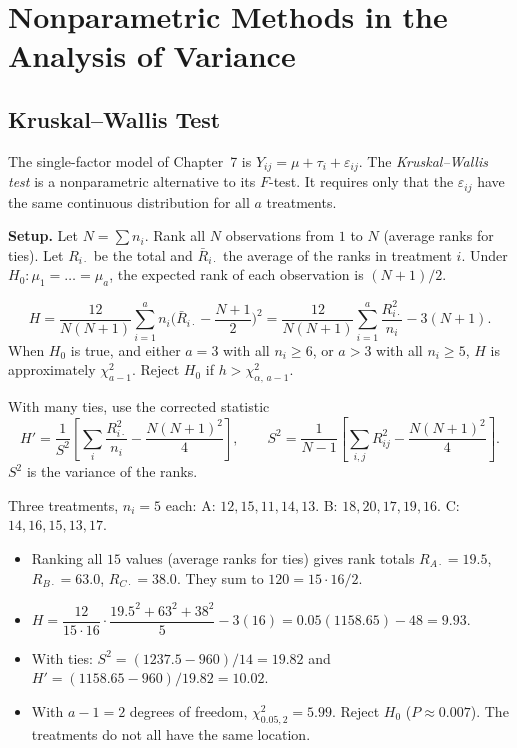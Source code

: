 \section{Nonparametric Methods in the Analysis of Variance}

\subsection{Kruskal--Wallis Test}

The single-factor model of Chapter~7 is $Y_{ij}=\mu+\tau_i+\varepsilon_{ij}$. The \emph{Kruskal--Wallis test} is a nonparametric alternative to its $F$-test. It requires only that the $\varepsilon_{ij}$ have the same continuous distribution for all $a$ treatments.

\textbf{Setup.} Let $N=\sum n_i$. Rank all $N$ observations from $1$ to $N$ (average ranks for ties). Let $R_{i\cdot}$ be the total and $\bar{R}_{i\cdot}$ the average of the ranks in treatment $i$. Under $H_0:\mu_1=\dots=\mu_a$, the expected rank of each observation is $(N+1)/2$.

\begin{theorem}\label{thm:kw}
\[ H=\frac{12}{N(N+1)}\sum_{i=1}^an_i\Big(\bar{R}_{i\cdot}-\frac{N+1}2\Big)^2=\frac{12}{N(N+1)}\sum_{i=1}^a\frac{R_{i\cdot}^2}{n_i}-3(N+1). \]
When $H_0$ is true, and either $a=3$ with all $n_i\ge6$, or $a>3$ with all $n_i\ge5$, $H$ is approximately $\chi^2_{a-1}$. Reject $H_0$ if $h>\chi^2_{\alpha,\,a-1}$.

With many ties, use the corrected statistic
\[ H'=\frac1{S^2}\left[\sum_i\frac{R_{i\cdot}^2}{n_i}-\frac{N(N+1)^2}4\right],\qquad S^2=\frac1{N-1}\left[\sum_{i,j}R_{ij}^2-\frac{N(N+1)^2}4\right]. \]
$S^2$ is the variance of the ranks.
\end{theorem}

\begin{example}\label{ex:kw}
Three treatments, $n_i=5$ each: A: $12,15,11,14,13$. B: $18,20,17,19,16$. C: $14,16,15,13,17$.
\begin{itemize}
  \item Ranking all $15$ values (average ranks for ties) gives rank totals $R_{A\cdot}=19.5$, $R_{B\cdot}=63.0$, $R_{C\cdot}=38.0$. They sum to $120=15\cdot16/2$.
  \item $H=\dfrac{12}{15\cdot16}\cdot\dfrac{19.5^2+63^2+38^2}5-3(16)=0.05(1158.65)-48=9.93$.
  \item With ties: $S^2=(1237.5-960)/14=19.82$ and $H'=(1158.65-960)/19.82=10.02$.
  \item With $a-1=2$ degrees of freedom, $\chi^2_{0.05,2}=5.99$. Reject $H_0$ ($P\approx0.007$). The treatments do not all have the same location.
\end{itemize}
\end{example}

